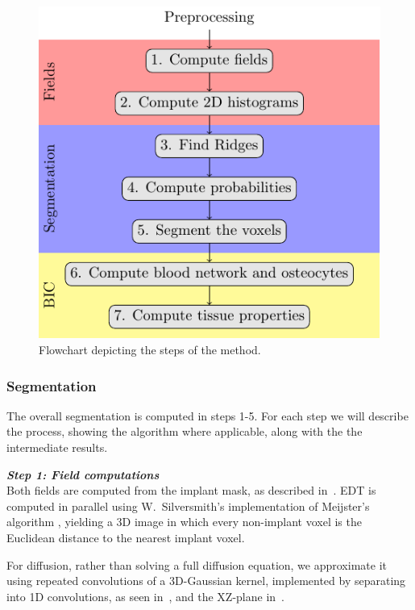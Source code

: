 \begin{figure}
  \centering
  \includegraphics{steps}
    \caption{Flowchart depicting the steps of the method.}
    \label{fig:flowchart}
\end{figure}

\subsubsection{Segmentation}
The overall segmentation is computed in steps 1-5. For each step we will describe the process, showing
the algorithm where applicable, along with the the intermediate results.

\vspace{\baselineskip}
\noindent\textit{\textbf{Step 1: Field computations}}\\
Both fields are computed from the implant mask, as described in~.
EDT is computed in parallel using W.~Silversmith's implementation of Meijster's algorithm \cite{pypi-edt},
yielding a 3D image in which every non-implant voxel is the Euclidean distance to the nearest implant voxel.

For diffusion, rather than solving a full diffusion equation, we approximate it using repeated convolutions
of a 3D-Gaussian kernel, implemented by separating into 1D convolutions, as seen in~, and the XZ-plane in~.

